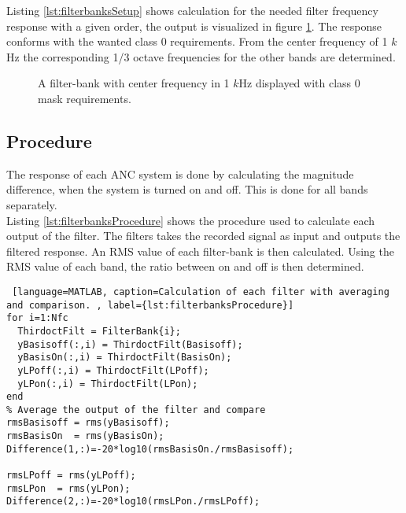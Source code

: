 Listing \ref{lst:filterbanksSetup} shows calculation for the needed filter frequency response with a given order, the output is visualized in figure \ref{fig:1000KhzFilterClass0}. The response conforms with the wanted class 0 requirements. From the center frequency of 1 $k$Hz the corresponding 1/3 octave frequencies for the other bands are determined.

\begin{figure}[H]
	\centering
	
	\caption{A filter-bank with center frequency in 1 $k$Hz displayed with class 0 mask requirements.}
	\label{fig:1000KhzFilterClass0}
\end{figure}

\subsection{Procedure}

The response of each ANC system is done by calculating the magnitude difference, when the system is turned on and off. This is done for all bands separately.  
\\
Listing \ref{lst:filterbanksProcedure} shows the procedure used to calculate each output of the filter. The filters takes the recorded signal as input and outputs the filtered response. An RMS value of each filter-bank is then calculated. Using the RMS value of each band, the ratio between on and off is then determined. 

\begin{lstlisting} [language=MATLAB, caption=Calculation of each filter with averaging and comparison. , label={lst:filterbanksProcedure}]
for i=1:Nfc
  ThirdoctFilt = FilterBank{i};  
  yBasisoff(:,i) = ThirdoctFilt(Basisoff);
  yBasisOn(:,i) = ThirdoctFilt(BasisOn); 
  yLPoff(:,i) = ThirdoctFilt(LPoff);
  yLPon(:,i) = ThirdoctFilt(LPon);    
end
% Average the output of the filter and compare
rmsBasisoff = rms(yBasisoff);
rmsBasisOn  = rms(yBasisOn);
Difference(1,:)=-20*log10(rmsBasisOn./rmsBasisoff);
  
rmsLPoff = rms(yLPoff);
rmsLPon  = rms(yLPon);
Difference(2,:)=-20*log10(rmsLPon./rmsLPoff);
\end{lstlisting}

%
%
%
%

